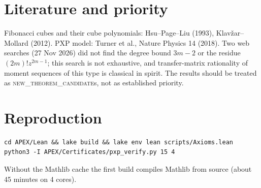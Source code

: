 \documentclass[10pt,a4paper]{article}
\theoremstyle{remark}\newtheorem{remark}[theorem]{Remark}
\begin{document}
\section{Literature and priority}\label{sec:lit}
Fibonacci cubes and their cube polynomials: Hsu--Page--Liu (1993), Klav\v{z}ar--Mollard (2012). PXP model: Turner et al., Nature Physics 14 (2018). Two web searches (27 Nov 2026) did not find the degree bound $3m-2$ or the residue $(2m)!z^{2m-1}$; this search is not exhaustive, and transfer-matrix rationality of moment sequences of this type is classical in spirit. The results should be treated as \textsc{new\_theorem\_candidate}s, not as established priority.

\section{Reproduction}
\begin{verbatim}
cd APEX/Lean && lake build && lake env lean scripts/Axioms.lean
python3 -I APEX/Certificates/pxp_verify.py 15 4
\end{verbatim}
Without the Mathlib cache the first build compiles Mathlib from source (about 45 minutes on 4 cores).
\end{document}

